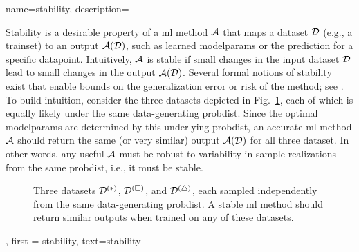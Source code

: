 {name={stability},
	description={
		Stability is a desirable property of a \gls{ml} method $\mathcal{A}$ that maps a 
		\gls{dataset} $\mathcal{D}$ (e.g., a \gls{trainset}) to an output $\mathcal{A}(\mathcal{D})$, such as learned 
		\gls{modelparams} or the \gls{prediction} for a specific \gls{datapoint}. Intuitively, $\mathcal{A}$ is 
		stable if small changes in the input \gls{dataset} $\mathcal{D}$ lead to small changes in the 
		output $\mathcal{A}(\mathcal{D})$. Several formal notions of stability exist that enable bounds 
		on the \gls{generalization} error or \gls{risk} of the method; see \cite[Ch.~13]{ShalevMLBook}.
		To build intuition, consider the three datasets depicted in Fig.~\ref{fig_three_data_stability}, each 
		of which is equally likely under the same \gls{data}-generating \gls{probdist}. Since the 
		optimal \gls{modelparams} are determined by this underlying \gls{probdist}, an accurate 
		\gls{ml} method $\mathcal{A}$ should return the same (or very similar) output $\mathcal{A}(\mathcal{D})$ 
		for all three \gls{dataset}. In other words, any useful $\mathcal{A}$ must be robust to 
		variability in sample \gls{realization}s from the same \gls{probdist}, i.e., it must be stable. 
		\begin{figure}[htbp]
			\centering
			\caption{Three \gls{dataset}s $\mathcal{D}^{(*)}$, $\mathcal{D}^{(\square)}$, and $\mathcal{D}^{(\triangle)}$, 
				each sampled independently from the same \gls{data}-generating \gls{probdist}. A stable \gls{ml} 
				method should return similar outputs when trained on any of these \gls{dataset}s. \label{fig_three_data_stability}}
		\end{figure}
		}, 
	first = {stability}, text={stability} 
}

